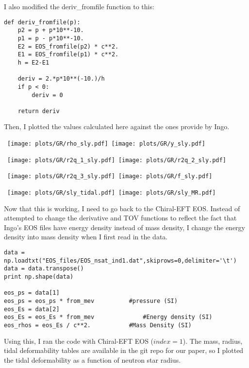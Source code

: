 \documentclass[11pt]{article}
\numberwithin{equation}{section}
\begin{document}
I also modified the deriv\_fromfile function to this:

\begin{lstlisting}
def deriv_fromfile(p):
    p2 = p + p*10**-10. 
    p1 = p - p*10**-10. 
    E2 = EOS_fromfile(p2) * c**2.
    E1 = EOS_fromfile(p1) * c**2. 
    h = E2-E1

    deriv = 2.*p*10**(-10.)/h
    if p < 0:
        deriv = 0
        
    return deriv
\end{lstlisting}

Then, I plotted the values calculated here against the ones provide by Ingo.

\begin{center}
\hbox{
\texttt{[image: plots/GR/rho\_sly.pdf]}
\texttt{[image: plots/GR/y\_sly.pdf]}}
\end{center}
\begin{center}
\hbox{
\texttt{[image: plots/GR/r2q\_1\_sly.pdf]}
\texttt{[image: plots/GR/r2q\_2\_sly.pdf]}}
\end{center}
\begin{center}
\hbox{
\texttt{[image: plots/GR/r2q\_3\_sly.pdf]}
\texttt{[image: plots/GR/f\_sly.pdf]}}
\end{center}

\begin{center}
\hbox{
\texttt{[image: plots/GR/sly\_tidal.pdf]}
\texttt{[image: plots/GR/sly\_MR.pdf]}}
\end{center}

Now that this is working, I need to go back to the Chiral-EFT EOS.  Instead of attempted to change the derivative and TOV functions to reflect the fact that Ingo's EOS files have energy density instead of mass density, I change the energy density into mass density when I first read in the data.  

\begin{lstlisting}
data = np.loadtxt("EOS_files/EOS_nsat_ind1.dat",skiprows=0,delimiter='\t')
data = data.transpose()
print np.shape(data)

eos_ps = data[1]      
eos_ps = eos_ps * from_mev      	#pressure (SI)
eos_Es = data[2]    
eos_Es = eos_Es * from_mev          	#Energy density (SI)
eos_rhos = eos_Es / c**2.			#Mass Density (SI)
\end{lstlisting}

Using this, I ran the code with Chiral-EFT EOS ($index=1$). The mass, radius, tidal deformability tables are available in the git repo for our paper, so I plotted the tidal deformability as a function of neutron star radius.
\end{document}
